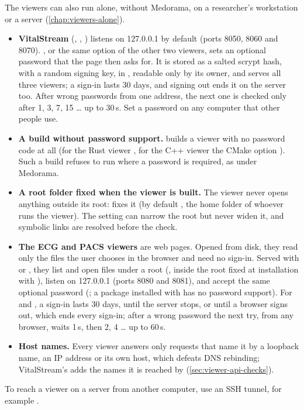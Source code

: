 The viewers can also run alone, without Medorama, on a researcher's workstation or a server
(\cref{chap:viewers-alone}).
\begin{itemize}
\item \textbf{VitalStream} (, , )
  listens on 127.0.0.1 by default (ports 8050, 8060 and 8070). , or the same option of the other two viewers, sets an optional password that
  the page then asks for. It is stored as a salted scrypt hash, with a random signing key, in
  , readable only by its owner, and serves
  all three viewers; a sign-in lasts 30 days, and signing out ends it on the server too. After
  wrong passwords from one address, the next one is checked only after 1, 3, 7, 15 \dots{} up to
  30\,s. Set a password on any computer that other people use.
\item \textbf{A build without password support.}  builds a viewer with no password code at all (for the Rust viewer
  , for the C++ viewer the CMake option
  ). Such a build refuses to run where a password is required, as under
  Medorama.
\item \textbf{A root folder fixed when the viewer is built.} The viewer never opens anything
  outside its root:  fixes it (by default \file{\textasciitilde}, the
  home folder of whoever runs the viewer). The  setting can narrow the root but
  never widen it, and symbolic links are resolved before the check.
\item \textbf{The ECG and PACS viewers} are web pages. Opened from disk, they read only the files
  the user chooses in the browser and need no sign-in. Served with  or
  , they list and open files under a root (, inside the root
  fixed at installation with ), listen on 127.0.0.1 (ports 8080 and 8081), and
  accept the same optional password (; a package installed with
   has no password support). For  and
  , a sign-in lasts 30 days, until the server stops, or until a browser
  signs out, which ends every sign-in; after a wrong password the next try, from any browser,
  waits 1\,s, then 2, 4 \dots{} up to 60\,s.
\item \textbf{Host names.} Every viewer answers only requests that name it by a loopback name,
  an IP address or its own host, which defeats DNS rebinding; VitalStream's
   adds the names it is reached by (\cref{sec:viewer-api-checks}).
\end{itemize}
To reach a viewer on a server from another computer, use an SSH tunnel, for example
.

